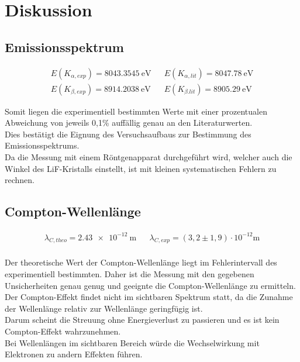 \section{Diskussion}
\label{sec:Diskussion}

\subsection{Emissionsspektrum}
\label{subsec:disk_emission}

\begin{align*}
    E(K_{\alpha,exp}) = \SI{8043,3545}{\electronvolt} &&  E(K_{\alpha,lit}) = \SI{8047,78}{\electronvolt}\\
    E(K_{\beta,exp}) = \SI{8914,2038}{\electronvolt}  &&  E(K_{\beta.lit}) = \SI{8905,29}{\electronvolt}
\end{align*}

\noindent Somit liegen die experimentiell bestimmten Werte mit einer prozentualen Abweichung von jeweils 0,1\% auffällig
genau an den Literaturwerten. \\
Dies bestätigt die Eignung des Versuchsaufbaus zur Bestimmung des Emissionsspektrums.\\
Da die Messung mit einem Röntgenapparat durchgeführt wird, welcher auch die Winkel des LiF-Kristalls einstellt, ist mit kleinen systematischen Fehlern zu rechnen.\\





\subsection{Compton-Wellenlänge}
\label{subsec:disk_compton}

\begin{align*}
    \lambda_{C, theo} = \SI{2,43e-12}{\meter} && \lambda_{C, exp} = \left(3,2\pm 1,9\right)\cdot 10^{-12}\unit{\meter}\\
\end{align*}

\noindent Der theoretische Wert der Compton-Wellenlänge liegt im Fehlerintervall des experimentiell bestimmten. Daher ist die Messung
mit den gegebenen Unsicherheiten genau genug und geeignte die Compton-Wellenlänge zu ermitteln.\\
Der Compton-Effekt findet nicht im sichtbaren Spektrum statt, da die Zunahme der Wellenlänge
relativ zur Wellenlänge geringfügig ist.\\
Darum scheint die Streuung ohne Energieverlust zu passieren und es ist kein Compton-Effekt wahrzunehmen.\\
Bei Wellenlängen im sichtbaren Bereich würde die Wechselwirkung mit Elektronen zu andern Effekten führen.\\